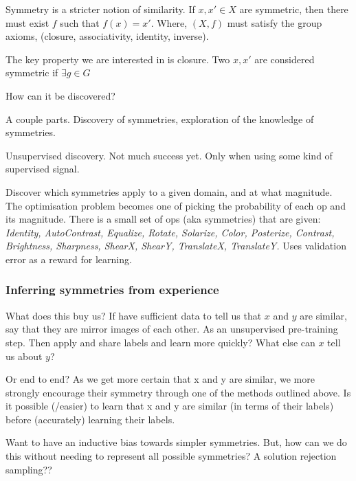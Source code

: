 Symmetry is a stricter notion of similarity.
If $x, x' \in X$ are symmetric, then there must exist $f$ such that $f(x) = x'$.
Where, $(X, f)$ must satisfy the group axioms, (closure, associativity, identity, inverse).

The key property we are interested in is closure.
Two $x, x'$ are considered symmetric if $\exists g\in G$


How can it be discovered?

A couple parts. Discovery of symmetries, exploration of the knowledge of symmetries.

Unsupervised discovery. Not much success yet. Only when using some kind of supervised signal.

\cite{Ho2019a, Lim2019, Cubuk2018, Cubuk2019}
Discover which symmetries apply to a given domain, and at what magnitude.
The optimisation problem becomes one of picking the probability of each op and its magnitude.
There is a small set of ops (aka symmetries) that are given:
\textit{Identity, AutoContrast, Equalize, Rotate, Solarize, Color, Posterize, Contrast,
	Brightness, Sharpness, ShearX, ShearY, TranslateX, TranslateY.}
Uses validation error as a reward for learning.

\subsubsection{Inferring symmetries from experience}



What does this buy us? If have sufficient data to tell us that $x$ and $y$ are
similar, say that they are mirror images of each other.
As an unsupervised pre-training step. Then apply and share labels and learn more quickly?
What else can $x$ tell us about $y$?

\cite{Yang2019}

Or end to end? As we get more certain that x and y are similar, we more strongly
encourage their symmetry through one of the methods outlined above.
Is it possible (/easier) to learn that x and y are similar (in terms of their labels) before (accurately) learning their labels.



Want to have an inductive bias towards simpler symmetries. But, how can we do this without needing to represent all possible symmetries?
A solution rejection sampling??



